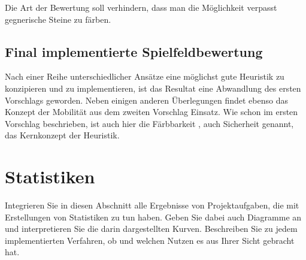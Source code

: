 \documentclass[12pt,a4paper,bibliography=totocnumbered,listof=totocnumbered]{scrartcl}
\begin{document}
    Die Art der Bewertung soll verhindern, dass man die Möglichkeit verpasst gegnerische Steine zu färben.








    \subsection{Final implementierte Spielfeldbewertung}
	
	Nach einer Reihe unterschiedlicher Ansätze eine möglichst gute Heuristik zu konzipieren und zu implementieren, ist das Resultat eine Abwandlung des ersten Vorschlags geworden. Neben einigen anderen Überlegungen findet ebenso das Konzept der Mobilität aus dem zweiten Vorschlag Einsatz.
	Wie schon im ersten Vorschlag beschrieben, ist auch hier die \glqq Färbbarkeit \grqq, auch \glqq Sicherheit \grqq genannt, das Kernkonzept der Heuristik.



    \newpage
    \section{Statistiken}
    Integrieren Sie in diesen Abschnitt alle Ergebnisse von Projektaufgaben, die mit Erstellungen von Statistiken zu tun haben. Geben Sie dabei auch Diagramme an und interpretieren Sie die darin dargestellten Kurven. Beschreiben Sie zu jedem implementierten Verfahren, ob und welchen Nutzen es aus Ihrer Sicht gebracht hat.




	
\end{document}
